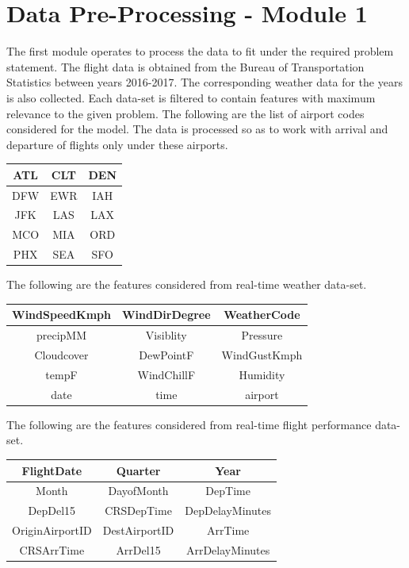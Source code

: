 \documentclass{article}
\begin{document}
\section{Data Pre-Processing - Module 1}
The first module operates to process the data to fit under the required problem statement. The flight data is obtained from the Bureau of Transportation Statistics between years 2016-2017. The corresponding weather data for the years is also collected. Each data-set is filtered to contain features with maximum relevance to the given problem. The following are the list of airport codes considered for the model. The data is processed so as to work with arrival and departure of flights only under these airports.
\begin{center}
 \label{tab:title} 
\begin{tabular}{ |c|c|c| } 
 \hline
 ATL & CLT & DEN \\ 
 \hline
 DFW & EWR & IAH \\
 \hline
 JFK & LAS & LAX \\
 \hline
 MCO & MIA & ORD \\
 \hline
 PHX & SEA & SFO \\ 
 \hline
\end{tabular}
\end{center}

The following are the features considered from real-time weather data-set.
\begin{center}
 \label{tab:title} 
\begin{tabular}{ |c|c|c| } 
 \hline
 WindSpeedKmph & WindDirDegree & WeatherCode \\ 
 \hline
 precipMM & Visiblity & Pressure \\
 \hline
 Cloudcover & DewPointF & WindGustKmph \\
 \hline
 tempF & WindChillF & Humidity \\
 \hline
 date & time & airport \\ 
 \hline
\end{tabular}
\end{center}

The following are the features considered from real-time flight performance data-set.

\begin{center}
 \label{tab:title} 

\begin{tabular}{ |c|c|c| } 
 \hline
 FlightDate & Quarter & Year \\ 
 \hline
 Month & DayofMonth & DepTime \\
 \hline
 DepDel15 & CRSDepTime & DepDelayMinutes \\
 \hline
 OriginAirportID & DestAirportID & ArrTime \\
 \hline
 CRSArrTime & ArrDel15 & ArrDelayMinutes \\ 
 \hline
\end{tabular}
\end{center}
\end{document}
